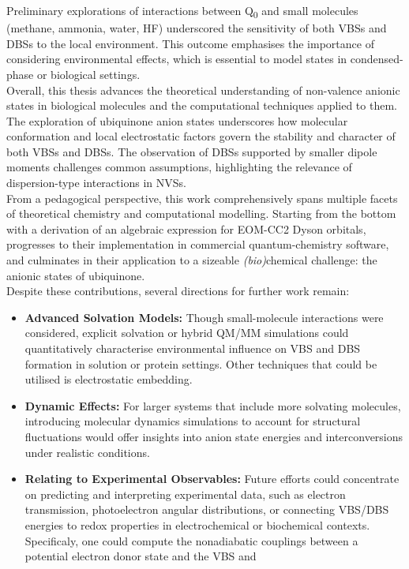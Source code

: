 Preliminary explorations of interactions between Q\textsubscript{0} and small molecules (methane, ammonia, water, HF) underscored the sensitivity of both VBSs and DBSs to the local environment. This outcome emphasises the importance of considering environmental effects, which is essential to model states in condensed-phase or biological settings.\\

Overall, this thesis advances the theoretical understanding of non-valence anionic states in biological molecules and the computational techniques applied to them. The exploration of ubiquinone anion states underscores how molecular conformation and local electrostatic factors govern the stability and character of both VBSs and DBSs. The observation of DBSs supported by smaller dipole moments challenges common assumptions, highlighting the relevance of dispersion-type interactions in NVSs.\\

From a pedagogical perspective, this work comprehensively spans multiple facets of theoretical chemistry and computational modelling. Starting from the bottom with a derivation of an algebraic expression for EOM-CC2 Dyson orbitals, progresses to their implementation in commercial quantum-chemistry software, and culminates in their application to a sizeable \textit{(bio)}chemical challenge: the anionic states of ubiquinone.\\

Despite these contributions, several directions for further work remain:
\begin{itemize}
    \item \textbf{Advanced Solvation Models:} Though small-molecule interactions were considered, explicit solvation or hybrid QM/MM simulations could quantitatively characterise environmental influence on VBS and DBS formation in solution or protein settings. Other techniques that could be utilised is electrostatic embedding.
    \item \textbf{Dynamic Effects:} For larger systems that include more solvating molecules, introducing molecular dynamics simulations to account for structural fluctuations would offer insights into anion state energies and interconversions under realistic conditions.
    \item \textbf{Relating to Experimental Observables:} Future efforts could concentrate on predicting and interpreting experimental data, such as electron transmission, photoelectron angular distributions, or connecting VBS/DBS energies to redox properties in electrochemical or biochemical contexts. Specificaly, one could compute the nonadiabatic couplings between a potential electron donor state and the VBS and
\end{itemize}
    
